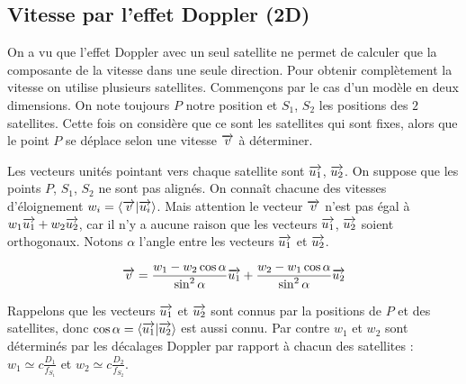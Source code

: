 \documentclass[class=report,crop=false]{standalone}
\begin{document}
\subsection{Vitesse par l'effet Doppler (2D)}

On a vu que l'effet Doppler avec un seul satellite 
ne permet de calculer que la composante 
de la vitesse dans une seule direction. Pour obtenir complètement 
la vitesse on utilise plusieurs satellites.
Commençons par le cas d'un modèle en deux dimensions.
On note toujours $P$ notre position et $S_1$, $S_2$ les positions 
des $2$ satellites. Cette fois 
on considère que ce sont les satellites qui sont fixes, alors
que le point $P$ se déplace selon une vitesse $\overrightarrow v$ à déterminer.

Les vecteurs unités pointant vers chaque satellite sont $\overrightarrow{u_1}$, $\overrightarrow{u_2}$.
On suppose que les points $P$, $S_1$, $S_2$ ne sont pas alignés.
On connaît chacune des vitesses d'éloignement 
$w_i = \langle \overrightarrow v | \overrightarrow{u_i} \rangle$.
Mais attention le vecteur $\overrightarrow v$ n'est pas égal à $w_1 \overrightarrow{u_1} + w_2 \overrightarrow{u_2}$,
car il n'y a aucune raison que les vecteurs $\overrightarrow{u_1}$, $\overrightarrow{u_2}$ soient orthogonaux.
Notons $\alpha$ l'angle entre les vecteurs $\overrightarrow{u_1}$ et $\overrightarrow{u_2}$.
\begin{proposition}
$$\overrightarrow v = \frac{w_1 - w_2 \cos\alpha}{\sin^2\alpha} \overrightarrow{u_1} + 
 \frac{w_2 -w_1 \cos \alpha}{\sin^2\alpha} \overrightarrow{u_2}$$  
\end{proposition}


Rappelons que les vecteurs $\overrightarrow{u_1}$ et $\overrightarrow{u_2}$ sont connus par la positions
de $P$ et des satellites, donc $\cos\alpha = \langle \overrightarrow{u_1} | \overrightarrow{u_2} \rangle$ est aussi connu.
Par contre $w_1$ et $w_2$ sont déterminés par les décalages Doppler par rapport à chacun des satellites :
$w_1 \simeq c \frac{D_1}{f_{S_1}}$ et 
$w_2 \simeq c \frac{D_2}{f_{S_2}}$.
\end{document}

